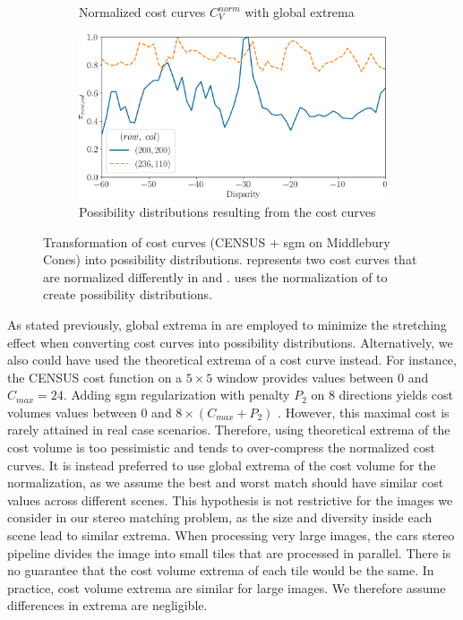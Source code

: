 \begin{figure}
\begin{subfigure}[t]{0.47\linewidth}
        \caption{Normalized cost curves $C_V^{norm}$ with global extrema}
        \label{fig:cost_curves_c}
    \end{subfigure}\hfill
    \begin{subfigure}[t]{0.47\linewidth}
        \centering
        \includegraphics[width=\linewidth]{Images/Chap_5/cost_curve_possibility_distribution.png}
        \caption{Possibility distributions resulting from the cost curves}
        \label{fig:cost_curves_d}
    \end{subfigure}\hfill
    \caption{Transformation of cost curves (CENSUS + \acrshort{sgm} on Middlebury Cones) into possibility distributions.  represents two cost curves that are normalized differently in  and .  uses the normalization of  to create possibility distributions.}
    \label{fig:cost_curves_to_possibility}
\end{figure}

As stated previously, global extrema in  are employed to minimize the stretching effect when converting cost curves into possibility distributions. Alternatively, we also could have used the theoretical extrema of a cost curve instead. For instance, the CENSUS cost function on a $5\times5$ window provides values between $0$ and $C_{max}=24$. Adding \acrshort{sgm} regularization with penalty $P_2$ on $8$ directions yields cost volumes values between $0$ and $8\times(C_{max}+P_2)$ \cite{hirschmuller_accurate_2005}. However, this maximal cost is rarely attained in real case scenarios. Therefore, using theoretical extrema of the cost volume is too pessimistic and tends to over-compress the normalized cost curves. It is instead preferred to use global extrema of the cost volume for the normalization, as we assume the best and worst match should have similar cost values across different scenes. This hypothesis is not restrictive for the images we consider in our stereo matching problem, as the size and diversity inside each scene lead to similar extrema.  When processing very large images, the \acrshort{cars} stereo pipeline divides the image into small tiles that are processed in parallel. There is no guarantee that the cost volume extrema of each tile would be the same. In practice, cost volume extrema are similar for large images. We therefore assume differences in extrema are negligible.

